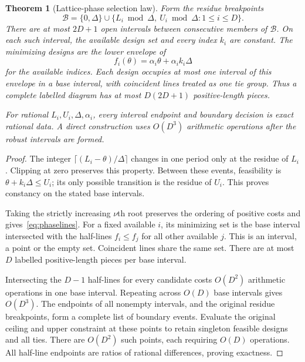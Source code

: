 \documentclass[11pt,a4paper]{article}
\newtheorem{theorem}{Theorem}\newtheorem{proposition}[theorem]{Proposition}\newtheorem{lemma}[theorem]{Lemma}\newtheorem{corollary}[theorem]{Corollary}\theoremstyle{definition}\newtheorem{definition}[theorem]{Definition}\newtheorem{example}[theorem]{Example}
\begin{document}
\begin{theorem}[Lattice-phase selection law]\label{thm:phase}
Form the residue breakpoints
\[
 \mathcal B=\{0,\Delta\}\cup
 \{L_i\bmod\Delta,\ U_i\bmod\Delta:1\le i\le D\}.
\]
There are at most $2D+1$ open intervals between consecutive members of
$\mathcal B$. On each such interval, the available design set and every
index $k_i$ are constant. The minimizing designs are the lower envelope of
\begin{equation}\label{eq:phaselines}
 f_i(\theta)=\alpha_i\theta+\alpha_i k_i\Delta
\end{equation}
for the available indices. Each design occupies at most one interval of
this envelope in a base interval, with coincident lines treated as one
tie group. Thus a complete labelled diagram has at most $D(2D+1)$
positive-length pieces.

For rational $L_i,U_i,\Delta,\alpha_i$, every interval endpoint and
boundary decision is exact rational data. A direct construction uses
$O(D^3)$ arithmetic operations after the robust intervals are formed.
\end{theorem}
\begin{proof}
The integer $\lceil(L_i-\theta)/\Delta\rceil$ changes in one period
only at the residue of $L_i$. Clipping at zero preserves this property.
Between these events, feasibility is $\theta+k_i\Delta\le U_i$;
its only possible transition is the residue of $U_i$.
This proves constancy on the stated base intervals.

Taking the strictly increasing $\nu$th root preserves the ordering of
positive costs and gives~\eqref{eq:phaselines}. For a fixed available
$i$, its minimizing set is the base interval intersected with the
half-lines $f_i\le f_j$ for all other available $j$. This is an interval,
a point or the empty set. Coincident lines share the same set. There are
at most $D$ labelled positive-length pieces per base interval.

Intersecting the $D-1$ half-lines for every candidate costs $O(D^2)$
arithmetic operations in one base interval. Repeating across $O(D)$
base intervals gives $O(D^3)$. The endpoints of all nonempty intervals,
and the original residue breakpoints, form a complete list of boundary
events. Evaluate the original ceiling and upper constraint at these
points to retain singleton feasible designs and all ties. There are
$O(D^2)$ such points, each requiring $O(D)$ operations. All half-line
endpoints are ratios of rational differences, proving exactness.
\end{proof}
\end{document}

